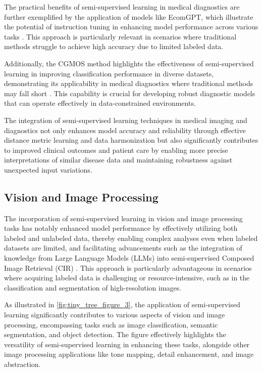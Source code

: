 The practical benefits of semi-supervised learning in medical diagnostics are further exemplified by the application of models like EcomGPT, which illustrate the potential of instruction tuning in enhancing model performance across various tasks \cite{li2023ecomgptinstructiontuninglargelanguage}. This approach is particularly relevant in scenarios where traditional methods struggle to achieve high accuracy due to limited labeled data.



Additionally, the CGMOS method highlights the effectiveness of semi-supervised learning in improving classification performance in diverse datasets, demonstrating its applicability in medical diagnostics where traditional methods may fall short \cite{zhang2016cgmoscertaintyguidedminority}. This capability is crucial for developing robust diagnostic models that can operate effectively in data-constrained environments.



The integration of semi-supervised learning techniques in medical imaging and diagnostics not only enhances model accuracy and reliability through effective distance metric learning and data harmonization but also significantly contributes to improved clinical outcomes and patient care by enabling more precise interpretations of similar disease data and maintaining robustness against unexpected input variations. \cite{arai2021diseaseorientedimageembeddingpseudoscanner}




\subsection{Vision and Image Processing} \label{subsec:Vision and Image Processing}

The incorporation of semi-supervised learning in vision and image processing tasks has notably enhanced model performance by effectively utilizing both labeled and unlabeled data, thereby enabling complex analyses even when labeled datasets are limited, and facilitating advancements such as the integration of knowledge from Large Language Models (LLMs) into semi-supervised Composed Image Retrieval (CIR) \cite{jang2024visualdeltageneratorlarge}. This approach is particularly advantageous in scenarios where acquiring labeled data is challenging or resource-intensive, such as in the classification and segmentation of high-resolution images. 

As illustrated in \autoref{fig:tiny_tree_figure_3}, the application of semi-supervised learning significantly contributes to various aspects of vision and image processing, encompassing tasks such as image classification, semantic segmentation, and object detection. The figure effectively highlights the versatility of semi-supervised learning in enhancing these tasks, alongside other image processing applications like tone mapping, detail enhancement, and image abstraction.

